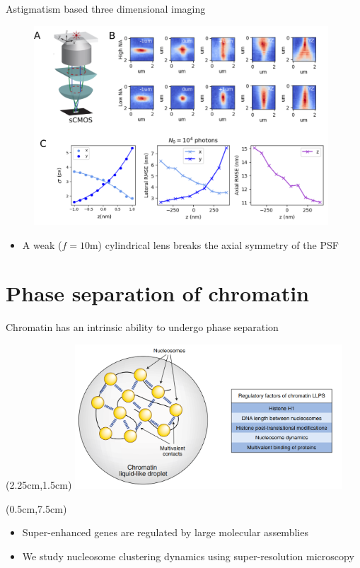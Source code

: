 \documentclass{beamer}					%
\begin{document}
\begin{frame}{Astigmatism based three dimensional imaging}
\begin{figure}
\includegraphics[width=11cm]{Astigmatism.png}
\end{figure}
\begin{itemize}
\item A weak ($f=10$m) cylindrical lens breaks the axial symmetry of the PSF
\end{itemize}
\end{frame}



\section{Phase separation of chromatin}
\begin{frame}{Chromatin has an intrinsic ability to undergo phase separation}

\begin{textblock*}{10cm}(2.25cm,1.5cm)
\includegraphics[width=10cm]{ChromatinLLPS.png}
\end{textblock*}


\begin{textblock*}{14cm}(0.5cm,7.5cm)
\begin{itemize}
\item Super-enhanced genes are regulated by large molecular assemblies
\item We study nucleosome clustering dynamics using super-resolution microscopy
\end{itemize}
\end{textblock*}

\end{frame}
\end{document}
